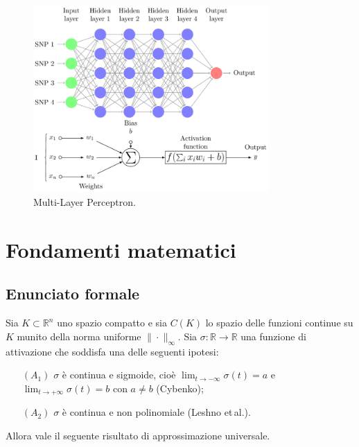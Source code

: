 \documentclass[a4paper,12pt]{report}
\begin{document}
	\begin{figure}[H]
		\centering
		\includegraphics[width=0.8\textwidth]{img/mlp.png}
		\caption{Multi-Layer Perceptron.}
	\end{figure}
	
	\section{Fondamenti matematici}
	
	\subsection{Enunciato formale}
	Sia \(K\subset\mathbb{R}^n\) uno spazio compatto e sia \(C(K)\) lo spazio delle funzioni continue su \(K\) munito della norma uniforme \(\|\cdot\|_\infty\). Sia \(\sigma:\mathbb{R}\to\mathbb{R}\) una funzione di attivazione che soddisfa una delle seguenti ipotesi:
	
	\begin{enumerate}
		\item[\((A_1)\)] \(\sigma\) è continua e sigmoide, cioè \(\lim_{t\to -\infty}\sigma(t)=a\) e \(\lim_{t\to +\infty}\sigma(t)=b\) con \(a\neq b\) (Cybenko);
		\item[\((A_2)\)] \(\sigma\) è continua e non polinomiale (Leshno et\,al.). 
	\end{enumerate}
	
	Allora vale il seguente risultato di approssimazione universale.
	
\end{document}
